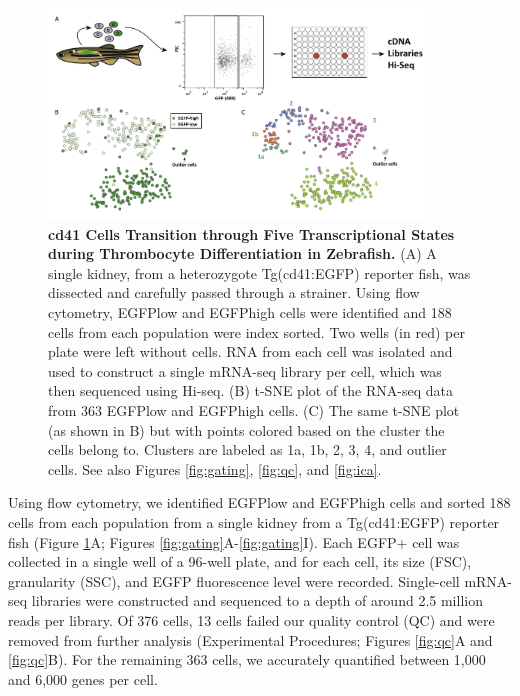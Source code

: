 \begin{figure}
    \centering
    \includegraphics[width=0.9\textwidth]{"Figure1"}
    \caption[cd41 Cells Transition through Five Transcriptional States during Thrombocyte Differentiation in Zebrafish]{\textbf{cd41 Cells Transition through Five Transcriptional States during Thrombocyte Differentiation in Zebrafish.} (A) A single kidney, from a heterozygote Tg(cd41:EGFP) reporter fish, was dissected and carefully passed through a strainer. Using flow cytometry, EGFPlow and EGFPhigh cells were identified and 188 cells from each population were index sorted. Two wells (in red) per plate were left without cells. RNA from each cell was isolated and used to construct a single mRNA-seq library per cell, which was then sequenced using Hi-seq. (B)	t-SNE plot of the RNA-seq data from 363 EGFPlow and EGFPhigh cells. (C)	The same t-SNE plot (as shown in B) but with points colored based on the cluster the cells belong to. Clusters are labeled as 1a, 1b, 2, 3, 4, and outlier cells. See also Figures \ref{fig:gating}, \ref{fig:qc}, and \ref{fig:ica}.}
    \label{fig:sorting}
\end{figure}

\begin{sloppypar}
Using flow cytometry, we identified EGFPlow and EGFPhigh cells and sorted 188 cells from each population from a single kidney from a Tg(cd41:EGFP) reporter fish (Figure \ref{fig:sorting}A; Figures \ref{fig:gating}A-\ref{fig:gating}I). Each EGFP+ cell was collected in a single well of a 96-well plate, and for each cell, its size (FSC), granularity (SSC), and EGFP fluorescence level were recorded. Single-cell mRNA-seq libraries were constructed and sequenced to a depth of around 2.5 million reads per library. Of 376 cells, 13 cells failed our quality control (QC) and were removed from further analysis (Experimental Procedures; Figures \ref{fig:qc}A and \ref{fig:qc}B). For the remaining 363 cells, we accurately quantified between 1,000 and 6,000 genes per cell.
\end{sloppypar}

